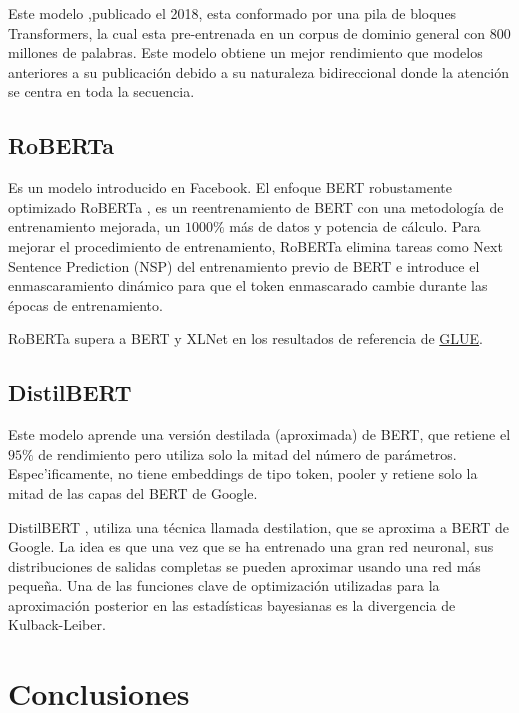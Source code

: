 \documentclass[conference]{IEEEtran}
\begin{document}
Este modelo \cite{b9},publicado el 2018, esta conformado por una pila de bloques Transformers, la cual esta pre-entrenada en un corpus de dominio general con 800 millones de palabras. 
Este modelo obtiene un mejor rendimiento que modelos anteriores a su publicación debido a su naturaleza bidireccional donde la atención se centra en toda la secuencia. 

\subsection{RoBERTa}

Es un modelo introducido en Facebook. El enfoque BERT robustamente optimizado RoBERTa \cite{b10}, es un reentrenamiento de BERT con una metodolog\'ia de entrenamiento mejorada, un $1000\%$ más de datos y potencia de cálculo. Para mejorar el procedimiento de entrenamiento, RoBERTa elimina tareas como Next Sentence Prediction (NSP) del entrenamiento previo de BERT e introduce el enmascaramiento dinámico para que el token enmascarado cambie durante las \'epocas de entrenamiento. 

\vspace{0.2cm}

RoBERTa supera a BERT y XLNet en los resultados de referencia de \href{https://gluebenchmark.com/}{GLUE}.

\subsection{DistilBERT}

Este modelo aprende una versión destilada (aproximada) de BERT, que retiene el $95\%$ de rendimiento pero utiliza solo la mitad del n\'umero de par\'ametros. Espec'ificamente, no tiene embeddings de tipo token, pooler y retiene solo la mitad de las capas del BERT de Google.

DistilBERT \cite{b11}, utiliza una técnica llamada destilation, que se aproxima a BERT de Google. La idea es que una vez que se ha entrenado una gran red neuronal, sus distribuciones de salidas completas se pueden aproximar usando una red más pequeña. Una de las funciones clave de optimización utilizadas para la aproximación posterior en las estadísticas bayesianas es la divergencia de Kulback-Leiber.

\section{Conclusiones}
\end{document}

